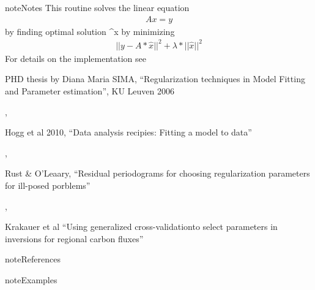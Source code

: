 \documentclass[a4paper,10pt,english]{sphinxmanual}
\begin{document}
\begin{fulllineitems}
\begin{sphinxadmonition}{note}{Notes}
This routine solves the linear equation
\begin{equation*}
\begin{split}A x = y\end{split}
\end{equation*}
by finding optimal solution \textasciicircum{}x by minimizing
\begin{equation*}
\begin{split}||y-A*\hat{x}||^2 + \lambda * ||\hat{x}||^2\end{split}
\end{equation*}
For details on the implementation see %
\begin{footnote}[1]\sphinxAtStartFootnote
PHD thesis by Diana Maria SIMA, “Regularization techniques in
Model Fitting and Parameter estimation”, KU Leuven 2006
%
\end{footnote}, %
\begin{footnote}[2]\sphinxAtStartFootnote
Hogg et al 2010, “Data analysis recipies: Fitting a model to data”
%
\end{footnote}, %
\begin{footnote}[3]\sphinxAtStartFootnote
Rust \& O’Leaary, “Residual periodograms for choosing regularization
parameters for ill-posed porblems”
%
\end{footnote}, %
\begin{footnote}[4]\sphinxAtStartFootnote
Krakauer et al “Using generalized cross-validationto select
parameters in inversions for regional carbon fluxes”
%
\end{footnote}
\end{sphinxadmonition}

\begin{sphinxadmonition}{note}{References}
\end{sphinxadmonition}

\begin{sphinxadmonition}{note}{Examples}


\end{sphinxadmonition}
\end{fulllineitems}
\end{document}
